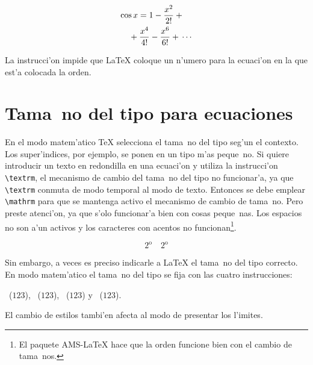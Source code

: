 \begin{example}
\begin{eqnarray}
\lefteqn{ \cos x = 1
     -\frac{x^{2}}{2!} +{} }
                    \nonumber\\
 & & {}+\frac{x^{4}}{4!}
     -\frac{x^{6}}{6!}+{}\cdots
\end{eqnarray}
\end{example}

\enlargethispage{\baselineskip}
La instrucci'on  impide que \LaTeX{} coloque un n'umero
para la ecuaci'on en la que est'a colocada la orden.


\section{Tama~no del tipo para ecuaciones}

 En el modo
matem'atico \TeX{} selecciona el tama~no del tipo seg'un el contexto.
Los super'indices, por ejemplo, se ponen en un tipo m'as peque~no. Si
quiere introducir un texto en redondilla en una ecuaci'on y utiliza la
instrucci'on \verb|\textrm|, el mecanismo de cambio del tama~no del
tipo no funcionar'a, ya que \verb|\textrm| conmuta de modo temporal al
modo de texto. Entonces se debe emplear \verb|\mathrm| para que se
mantenga activo el mecanismo de cambio de tama~no. Pero preste
atenci'on, ya que  s'olo funcionar'a bien con cosas
peque~nas. Los espacios no son a'un activos y los caracteres con
acentos no funcionan\footnote{El paquete AMS-\LaTeX{} hace que la
  orden  funcione bien con el cambio de tama~nos.}.

\begin{example}
\begin{equation}
2^\textrm{o} \quad 
2^\mathrm{o}
\end{equation}
\end{example}

Sin embargo, a veces es preciso indicarle a \LaTeX{} el tama~no del
tipo correcto. En modo matem'atico el tama~no del tipo se fija con las
cuatro instrucciones:
\begin{flushleft}
~($\displaystyle 123$),
~($\textstyle 123$), 
~($\scriptstyle 123$) y
~($\scriptscriptstyle 123$).
\end{flushleft}

El cambio de estilos tambi'en afecta al modo de presentar los
l'imites.

